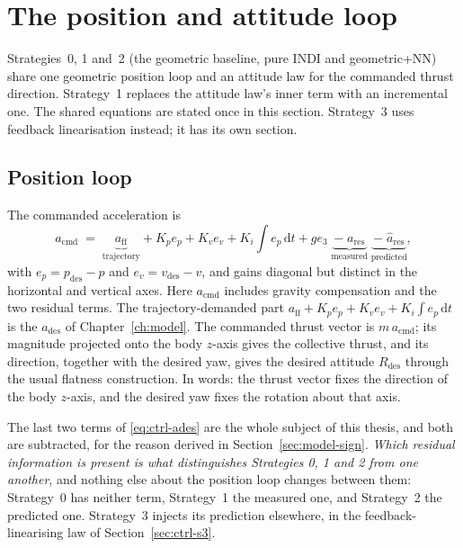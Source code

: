 \section{The position and attitude loop}
\label{sec:ctrl-common}

Strategies~0, 1 and~2 (the geometric baseline, pure INDI and geometric+NN) share one geometric
position loop and an attitude law for the commanded thrust direction. Strategy~1 replaces the
attitude law's inner term with an incremental one. The shared equations are stated once in this
section. Strategy~3 uses feedback linearisation instead; it has its own section.

\subsection{Position loop}

The commanded acceleration is
%
\begin{equation}
  a_{\mathrm{cmd}}
  \;=\; \underbrace{a_{\mathrm{ff}}}_{\text{trajectory}}
      + K_p e_p + K_v e_v + K_i \!\int\! e_p \,\mathrm{d}t
      + g e_3
      \;\underbrace{-\; a_{\mathrm{res}}}_{\text{measured}}
      \;\underbrace{-\; \hat{a}_{\mathrm{res}}}_{\text{predicted}},
  \label{eq:ctrl-ades}
\end{equation}
%
with $e_p = p_{\mathrm{des}} - p$ and $e_v = v_{\mathrm{des}} - v$, and gains diagonal but distinct
in the horizontal and vertical axes. Here $a_{\mathrm{cmd}}$ includes gravity compensation and the two residual terms. The
trajectory-demanded part $a_{\mathrm{ff}} + K_p e_p + K_v e_v + K_i \!\int\! e_p \,\mathrm{d}t$ is the
$a_{\mathrm{des}}$ of Chapter~\ref{ch:model}. The commanded thrust vector is $m\,a_{\mathrm{cmd}}$; its
magnitude projected onto the body $z$-axis gives the collective thrust, and its direction, together
with the desired yaw, gives the desired attitude $R_{\mathrm{des}}$ through the usual flatness
construction. In words: the thrust vector fixes the direction of the body $z$-axis, and the desired
yaw fixes the rotation about that axis.

The last two terms of \eqref{eq:ctrl-ades} are the whole subject of this thesis, and both are
subtracted, for the reason derived in Section~\ref{sec:model-sign}. \emph{Which residual
information is present is what distinguishes Strategies 0, 1 and 2 from one another}, and nothing
else about the position loop changes between them: Strategy~0 has neither term, Strategy~1 the
measured one, and Strategy~2 the predicted one. Strategy~3 injects its prediction elsewhere, in
the feedback-linearising law of Section~\ref{sec:ctrl-s3}.

